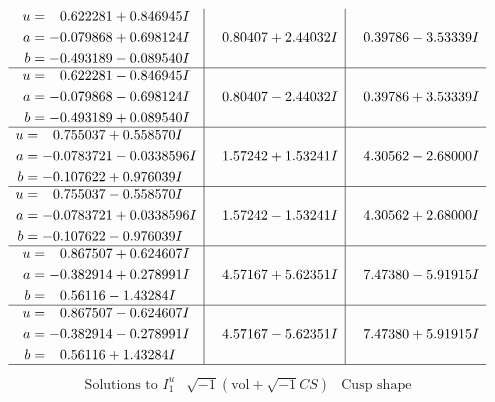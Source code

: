 \documentclass[1p]{elsarticle_modified}
\theoremstyle{definition}
\newcommand{\I}{\sqrt{-1}}
\begin{document}
$$\begin{array}{c|c|c}
\begin{aligned}
u &= \phantom{-}0.622281 + 0.846945 I \\
a &= -0.079868 + 0.698124 I \\
b &= -0.493189 - 0.089540 I\end{aligned}
 & \phantom{-}0.80407 + 2.44032 I & \phantom{-}0.39786 - 3.53339 I \\ \hline\begin{aligned}
u &= \phantom{-}0.622281 - 0.846945 I \\
a &= -0.079868 - 0.698124 I \\
b &= -0.493189 + 0.089540 I\end{aligned}
 & \phantom{-}0.80407 - 2.44032 I & \phantom{-}0.39786 + 3.53339 I \\ \hline\begin{aligned}
u &= \phantom{-}0.755037 + 0.558570 I \\
a &= -0.0783721 - 0.0338596 I \\
b &= -0.107622 + 0.976039 I\end{aligned}
 & \phantom{-}1.57242 + 1.53241 I & \phantom{-}4.30562 - 2.68000 I \\ \hline\begin{aligned}
u &= \phantom{-}0.755037 - 0.558570 I \\
a &= -0.0783721 + 0.0338596 I \\
b &= -0.107622 - 0.976039 I\end{aligned}
 & \phantom{-}1.57242 - 1.53241 I & \phantom{-}4.30562 + 2.68000 I \\ \hline\begin{aligned}
u &= \phantom{-}0.867507 + 0.624607 I \\
a &= -0.382914 + 0.278991 I \\
b &= \phantom{-}0.56116 - 1.43284 I\end{aligned}
 & \phantom{-}4.57167 + 5.62351 I & \phantom{-}7.47380 - 5.91915 I \\ \hline\begin{aligned}
u &= \phantom{-}0.867507 - 0.624607 I \\
a &= -0.382914 - 0.278991 I \\
b &= \phantom{-}0.56116 + 1.43284 I\end{aligned}
 & \phantom{-}4.57167 - 5.62351 I & \phantom{-}7.47380 + 5.91915 I\\
 \hline 
 \end{array}$$\newpage$$\begin{array}{c|c|c}  
\text{Solutions to }I^u_{1}& \I (\text{vol} + \sqrt{-1}CS) & \text{Cusp shape}\\

\end{array}$$
\end{document}
